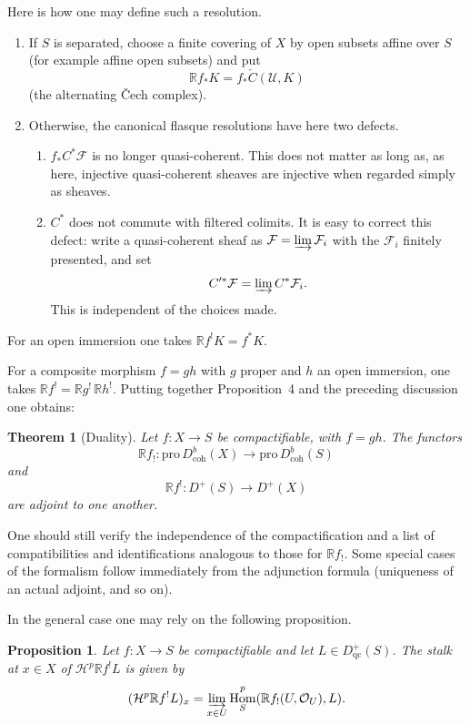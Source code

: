 \documentclass[11pt]{amsart}
\DeclareMathOperator{\Hom}{Hom}
\newcommand{\Pro}{\text{pro}\,}
\newcommand{\coh}{\text{coh}}
\newcommand{\cF}{\mathcal{F}}
\newcommand{\cH}{\mathcal{H}}
\newcommand{\cO}{\mathcal{O}}
\newcommand{\cU}{\mathcal{U}}
\newcommand{\cDb}{D^{b}}
\newcommand{\cD}{D}
\newcommand{\bR}{\mathbb{R}}
\theoremstyle{plain}
\newtheorem{prop}{Proposition}
\newtheorem{thm}{Theorem}
\theoremstyle{definition}
\begin{document}
Here is how one may define such a resolution.

\begin{enumerate}
\item If $S$ is separated, choose a finite covering of $X$ by open subsets affine over $S$ (for example affine open subsets) and put
\[
\bR f_*K=f_*\check C(\cU,K)
\]
(the alternating \v{C}ech complex).

\item Otherwise, the canonical flasque resolutions have here two defects.
\begin{enumerate}
\item[(a)] $f_*C^*\cF$ is no longer quasi-coherent. This does not matter as long as, as here, injective quasi-coherent sheaves are injective when regarded simply as sheaves.
\item[(b)] $C^*$ does not commute with filtered colimits. It is easy to correct this defect: write a quasi-coherent sheaf as $\cF=\varinjlim \cF_i$ with the $\cF_i$ finitely presented, and set
\[
C'^*\cF=\varinjlim C^*\cF_i.
\]
This is independent of the choices made.
\end{enumerate}
\end{enumerate}

For an open immersion one takes $\bR f^{!}K=f^*K$.

For a composite morphism $f=gh$ with $g$ proper and $h$ an open immersion, one takes $\bR f^{!}=\bR g^{!}\,\bR h^{!}$. Putting together Proposition~4 and the preceding discussion one obtains:

\begin{thm}[Duality]
Let $f\colon X\to S$ be compactifiable, with $f=gh$. The functors
\[
\bR f_!\colon \Pro\cDb_{\coh}(X)\to \Pro\cDb_{\coh}(S)
\]
and
\[
\bR f^{!}\colon \cD^+(S)\to \cD^+(X)
\]
are adjoint to one another.
\end{thm}

One should still verify the independence of the compactification and a list of compatibilities and identifications analogous to those for $\bR f_!$. Some special cases of the formalism follow immediately from the adjunction formula (uniqueness of an actual adjoint, and so on).

In the general case one may rely on the following proposition.

\begin{prop}
Let $f\colon X\to S$ be compactifiable and let $L\in \cD^+_{\mathrm{qc}}(S)$. The stalk at $x\in X$ of $\cH^p\bR f^{!}L$ is given by
\[
(\cH^p\bR f^{!}L)_x=\varinjlim_{x\in U} \Hom^p_S(\bR f_!(U,\cO_U),L).
\]
\end{prop}
\end{document}

